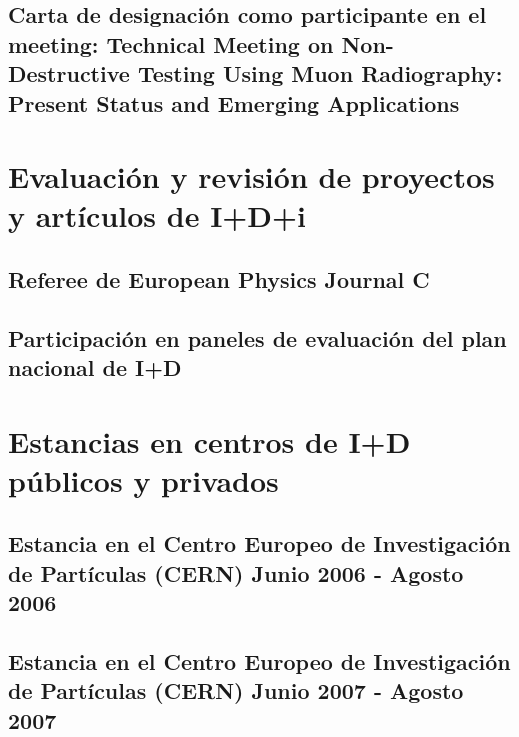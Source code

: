 \documentclass[a4paper, 11pt, twoside, openright]{report}
\begin{document}
\subsection{Carta de designación como participante en el meeting: Technical Meeting on Non-Destructive Testing Using Muon Radiography: Present Status and Emerging Applications}






\section{Evaluación y revisión de proyectos y artículos de I+D+i}

\subsection{Referee de European Physics Journal C}



\subsection{Participación en paneles de evaluación del plan nacional de I+D}



\section{Estancias en centros de I+D públicos y privados}
\subsection{Estancia en el Centro Europeo de Investigación de Partículas (CERN) Junio 2006 - Agosto 2006}

\subsection{Estancia en el Centro Europeo de Investigación de Partículas (CERN) Junio 2007 - Agosto 2007}

\end{document}
